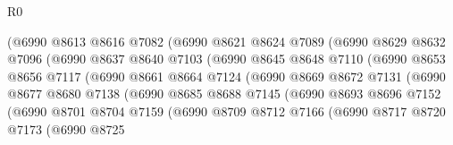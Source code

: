 \begin{lexlean}{R0}
\begin{coremodule}
                        (@6990
                          @8613
                          @8616
                          @7082
                          (@6990
                            @8621
                            @8624
                            @7089
                            (@6990
                              @8629
                              @8632
                              @7096
                              (@6990
                                @8637
                                @8640
                                @7103
                                (@6990
                                  @8645
                                  @8648
                                  @7110
                                  (@6990
                                    @8653
                                    @8656
                                    @7117
                                    (@6990
                                      @8661
                                      @8664
                                      @7124
                                      (@6990
                                        @8669
                                        @8672
                                        @7131
                                        (@6990
                                          @8677
                                          @8680
                                          @7138
                                          (@6990
                                            @8685
                                            @8688
                                            @7145
                                            (@6990
                                              @8693
                                              @8696
                                              @7152
                                              (@6990
                                                @8701
                                                @8704
                                                @7159
                                                (@6990
                                                  @8709
                                                  @8712
                                                  @7166
                                                  (@6990
                                                    @8717
                                                    @8720
                                                    @7173
                                                    (@6990
                                                      @8725

\end{coremodule}
\end{lexlean}
